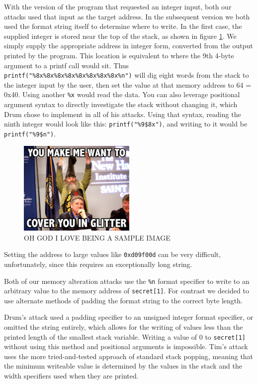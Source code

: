 With the version of the program that requested an integer input, both our attacks used that input as the target address.
In the subsequent version we both used the format string itself to determine where to write. In the first case, the
supplied integer is stored near the top of the stack, as shown in figure \ref{fig_vul_prog_stack}. We simply supply the
appropriate address in integer form, converted from the output printed by the program. This location is equivalent to
where the 9th 4-byte argument to a printf call would sit. Thus {\tt printf("\%8x\%8x\%8x\%8x\%8x\%8x\%8x\%8x\%n")} will
dig eight words from the stack to the integer input by the user, then set the value at that memory address to 64 = 0x40.
Using another {\tt\%x} would read the data. You can also leverage positional argument syntax to directly investigate the
stack without changing it, which Drum chose to implement in all of his attacks. Using that syntax, reading the ninth
integer would look like this: {\tt printf("\%9\$8x")}, and writing to it would be {\tt printf("\%9\$n")}.

\begin{figure}[ht] \centering \includegraphics[width = 0.5\textwidth]{./images/placeholder.jpg} \caption{OH GOD I LOVE
BEING A SAMPLE IMAGE} \label{fig_vul_prog_stack} \end{figure}

Setting the address to large values like {\tt 0xd09f00d} can be very difficult, unfortunately, since this requires an
exceptionally long string.

Both of our memory alteration attacks use the {\tt \%n} format specifier to write to an arbitrary value to the memory
address of {\tt secret[1]}. For contrast we decided to use alternate methods of padding the format string to the correct byte
length.

Drum's attack used a padding specifier to an unsigned integer format specifier, or omitted the string entirely, which
allows for the writing of values less than the printed length of the smallest stack variable. Writing a value of 0 to
{\tt secret[1]} without using this method and positional arguments is impossible.
Tim's attack uses the more tried-and-tested approach of standard stack popping, meaning that the minimum writeable value
is determined by the values in the stack and the width specifiers used when they are printed.

